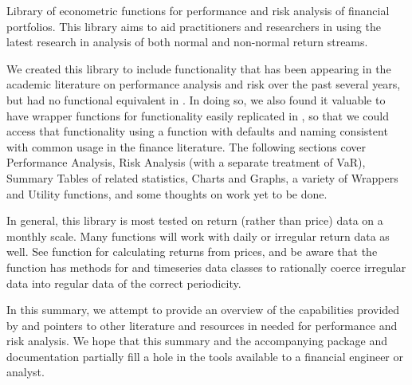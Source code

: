 \documentclass[12pt,letterpaper,english]{article}
\begin{document}
\begin{Description}\relax
Library of econometric functions for performance and risk analysis of financial portfolios. This library aims to aid practitioners and researchers in using the latest research in analysis of both normal and non-normal return streams.

We created this library to include functionality that has been appearing in the academic literature on performance analysis and risk over the past several years, but had no functional equivalent in \R.  In doing so, we also found it valuable to have wrapper functions for functionality easily replicated in \R, so that we could access that functionality using a function with defaults and naming consistent with common usage in the finance literature.  The following sections cover Performance Analysis, Risk Analysis (with a separate treatment of VaR), Summary Tables of related statistics, Charts and Graphs, a variety of Wrappers and Utility functions, and some thoughts on work yet to be done.
\end{Description}
\begin{Details}\relax
{}
In general, this library is most tested on return (rather than price) data on a monthly scale. Many functions will work with daily or irregular return data as well.  See function  for calculating returns from prices, and be aware that the  function has methods for  and  timeseries data classes to rationally coerce irregular data into regular data of the correct periodicity.

In this summary, we attempt to provide an overview of the capabilities provided by  and pointers to other literature and resources in \R{} needed for performance and risk analysis.  We hope that this summary and the accompanying package and documentation partially fill a hole in the tools available to a financial engineer or analyst.
\end{Details}
\end{document}

